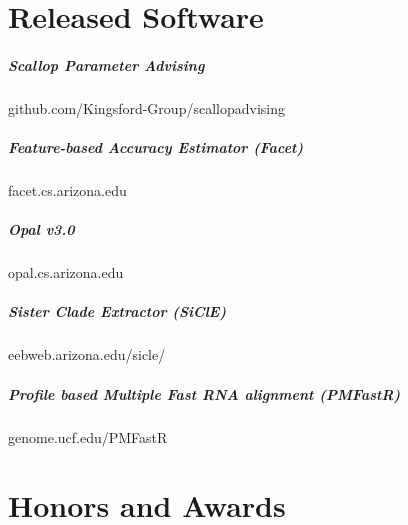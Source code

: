 \documentclass[10pt,letterpaper]{article}
\begin{document}





\section*{Released Software}
\subparagraph{Scallop Parameter Advising}						github.com/Kingsford-Group/scallopadvising
\subparagraph{Feature-based Accuracy Estimator (Facet)} 			facet.cs.arizona.edu
\subparagraph{Opal v3.0}										opal.cs.arizona.edu 
\subparagraph{Sister Clade Extractor (SiClE)}						eebweb.arizona.edu/sicle/
\subparagraph{Profile based Multiple Fast RNA alignment (PMFastR)}	genome.ucf.edu/PMFastR 

\section*{Honors and Awards}
\end{document}
